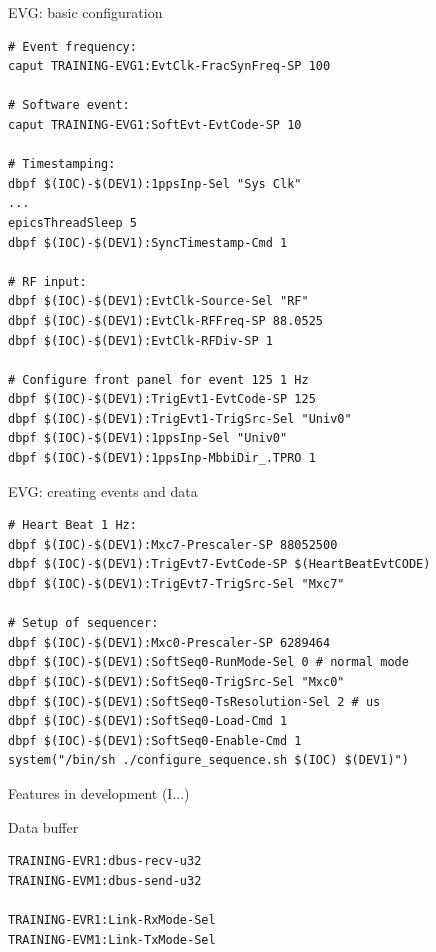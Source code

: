 \documentclass[
  9pt
  , table
  , ignorenonframetext
]{beamer}
\begin{document}
\begin{frame}[fragile]{EVG: basic configuration}
\begin{lstlisting}[style=termstyle,breaklines=true,basicstyle=\scriptsize]
# Event frequency:
caput TRAINING-EVG1:EvtClk-FracSynFreq-SP 100

# Software event:
caput TRAINING-EVG1:SoftEvt-EvtCode-SP 10

# Timestamping:
dbpf $(IOC)-$(DEV1):1ppsInp-Sel "Sys Clk"
...
epicsThreadSleep 5
dbpf $(IOC)-$(DEV1):SyncTimestamp-Cmd 1

# RF input:
dbpf $(IOC)-$(DEV1):EvtClk-Source-Sel "RF"
dbpf $(IOC)-$(DEV1):EvtClk-RFFreq-SP 88.0525
dbpf $(IOC)-$(DEV1):EvtClk-RFDiv-SP 1

# Configure front panel for event 125 1 Hz
dbpf $(IOC)-$(DEV1):TrigEvt1-EvtCode-SP 125
dbpf $(IOC)-$(DEV1):TrigEvt1-TrigSrc-Sel "Univ0"
dbpf $(IOC)-$(DEV1):1ppsInp-Sel "Univ0"
dbpf $(IOC)-$(DEV1):1ppsInp-MbbiDir_.TPRO 1

\end{lstlisting}
\end{frame}

\begin{frame}[fragile]{EVG: creating events and data}
\begin{lstlisting}[style=termstyle,breaklines=true,basicstyle=\scriptsize]
# Heart Beat 1 Hz:
dbpf $(IOC)-$(DEV1):Mxc7-Prescaler-SP 88052500
dbpf $(IOC)-$(DEV1):TrigEvt7-EvtCode-SP $(HeartBeatEvtCODE)
dbpf $(IOC)-$(DEV1):TrigEvt7-TrigSrc-Sel "Mxc7"

# Setup of sequencer:
dbpf $(IOC)-$(DEV1):Mxc0-Prescaler-SP 6289464
dbpf $(IOC)-$(DEV1):SoftSeq0-RunMode-Sel 0 # normal mode
dbpf $(IOC)-$(DEV1):SoftSeq0-TrigSrc-Sel "Mxc0"
dbpf $(IOC)-$(DEV1):SoftSeq0-TsResolution-Sel 2 # us
dbpf $(IOC)-$(DEV1):SoftSeq0-Load-Cmd 1
dbpf $(IOC)-$(DEV1):SoftSeq0-Enable-Cmd 1
system("/bin/sh ./configure_sequence.sh $(IOC) $(DEV1)")

\end{lstlisting}
\end{frame}

\begin{frame}[fragile]{Features in development (I...)}
  \begin{block}{Data buffer}
\begin{lstlisting}[style=termstyle,breaklines=true,basicstyle=\scriptsize]
TRAINING-EVR1:dbus-recv-u32
TRAINING-EVM1:dbus-send-u32

TRAINING-EVR1:Link-RxMode-Sel
TRAINING-EVM1:Link-TxMode-Sel
\end{lstlisting}
  \end{block}
\end{frame}
\end{document}
